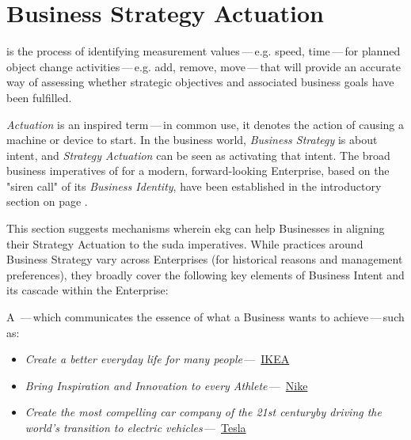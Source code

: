 \chapter{Business Strategy Actuation}%
\label{ch:ekg-mm-a-1}
\label{ch:ekg-mm-business-strategy-actuation}

\textbf{} is the process of identifying measurement values\,---\,e.g.
speed, time\,---\,for planned object change activities\,---\,e.g. add, remove, move\,---\,that will provide an
accurate way of assessing whether strategic objectives and associated business goals have been fulfilled.

\textit{Actuation} is an inspired term\,---\,in common use, it denotes the action of causing a
machine or device to start.
In the business world, \textit{Business Strategy} is about intent, and \textit{Strategy Actuation}
can be seen as activating that intent.
The broad business imperatives of  for a modern, forward-looking Enterprise,
based on the "siren call" of its \textit{Business Identity}, have been established in the introductory section on page
\pageref{sec:ekg-mm-business-identity}.

This section suggests mechanisms wherein \gls{ekg} can help Businesses in aligning their Strategy Actuation to
the \gls{suda} imperatives.
While practices around Business Strategy vary across Enterprises (for historical reasons and management preferences),
they broadly cover the following key elements of Business Intent and its cascade within the Enterprise:

A \textbf{}\,---\,which communicates the essence of what a Business wants to
achieve\,---\,such as:
\begin{itemize}
  \item \textit{Create a better everyday life for many people}\,---\,%
        \href{https://www.ikea.com/gb/en/this-is-ikea/about-us/vision-and-business-idea-pub9cd02291}{IKEA}
  \item \textit{Bring Inspiration and Innovation to every Athlete}\,---\,%
        \href{https://www.nike.com/gb/help/a/nikeinc-mission}{Nike}
  \item \textit{Create the most compelling car company of the 21st century\newline by driving the world's
        transition to electric vehicles}\,---\,%
        \href{https://visionarybusinessperson.com/tesla-mission-statement/}{Tesla}
\end{itemize}

